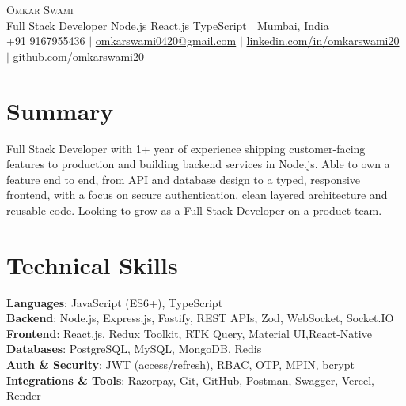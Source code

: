 \documentclass[a4paper,11pt]{article}
\begin{document}
\begin{center}
  {\Huge \scshape Omkar Swami} \\ \vspace{2pt}
  \small Full Stack Developer \textbar{} Node.js \textbar{} React.js \textbar{} TypeScript \quad $|$ \quad Mumbai, India \\ \vspace{3pt}
  \small +91 9167955436 $|$
  \href{mailto:omkarswami0420@gmail.com}{omkarswami0420@gmail.com} $|$
  \href{https://linkedin.com/in/omkarswami20}{linkedin.com/in/omkarswami20} $|$
  \href{https://github.com/omkarswami20}{github.com/omkarswami20}
\end{center}
\vspace{-8pt}

\section{Summary}
\small{Full Stack Developer with 1+ year of experience shipping customer-facing features to production and building backend services in Node.js. Able to own a feature end to end, from API and database design to a typed, responsive frontend, with a focus on secure authentication, clean layered architecture and reusable code. Looking to grow as a Full Stack Developer on a product team.}

\section{Technical Skills}
\begin{itemize}[leftmargin=0in, label={}]
\small{\item{
  \textbf{Languages}{: JavaScript (ES6+), TypeScript} \\
  \textbf{Backend}{: Node.js, Express.js, Fastify, REST APIs, Zod, WebSocket, Socket.IO} \\
  \textbf{Frontend}{: React.js, Redux Toolkit, RTK Query, Material UI,React-Native} \\
  \textbf{Databases}{: PostgreSQL, MySQL, MongoDB, Redis} \\
  \textbf{Auth \& Security}{: JWT (access/refresh), RBAC, OTP, MPIN, bcrypt} \\
  \textbf{Integrations \& Tools}{: Razorpay, Git, GitHub, Postman, Swagger, Vercel, Render}
}}
\end{itemize}
\vspace{-6pt}
\end{document}
